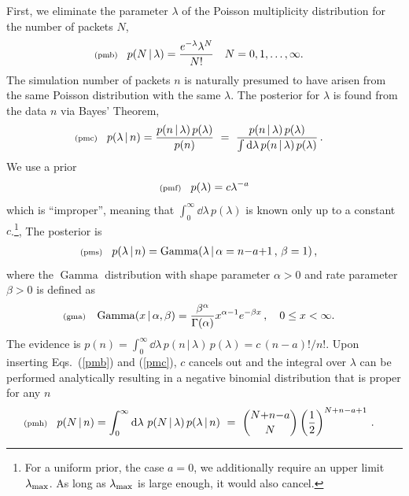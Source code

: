\documentclass[11pt]{article}
\newcommand{\lleq}[1]{\label{#1} }
\renewcommand{\lleq}[1]{\label{#1} {\scriptstyle {\rm (#1)}} \hspace*{2ex} }
\newcommand{\cond}{\,|\,}
\DeclareMathOperator{\GammaDist}{Gamma}
\newcommand{\rmdx}[1]{\dd{#1}} %
\begin{document}
First, we eliminate the parameter $\lambda$ of the Poisson
multiplicity distribution for the number of packets $N$,
\begin{align}
  \lleq{pmb}
  p(N\cond\lambda) &= \frac{e^{-\lambda}\lambda^{N}}{N!}
  \quad N = 0,1,\ldots,\infty.
\end{align}
The simulation number of packets $n$ is naturally presumed to have
arisen from the same Poisson distribution with the same $\lambda$.
The posterior for $\lambda$ is found from the data $n$ via Bayes'
Theorem,
\begin{align}
  \lleq{pmc}
  p(\lambda\cond n) %
  &= \frac{p(n\cond\lambda)\,p(\lambda)} {p(n)}
  \ =\ \frac{p(n\cond\lambda)\,p(\lambda)} %
  {\int \rmdx{\lambda} p(n\cond\lambda)\,p(\lambda)} \,.
\end{align}
We use a prior
\begin{align}
  \lleq{pmf}
  p(\lambda) = c \lambda^{-a}
\end{align}
which is ``improper'', meaning that
$\int_0^\infty \rmdx{\lambda}\,p(\lambda)$ is known only up to a
constant $c$.\footnote{For a uniform prior, the case $a{=}0$, we
  additionally require an upper limit $\lambda_{\rm max}$. As long as
  $\lambda_{\rm max}$ is large enough, it would also cancel.}, The
posterior is
\begin{align}
  \lleq{pms}
  p(\lambda\cond n)
  &= \GammaDist(\lambda \cond \alpha = n{-}a{+}1 \,,\, \beta = 1)\,,
\end{align}
where the $\GammaDist$ distribution with shape parameter $\alpha > 0$ and
rate parameter $\beta > 0$ is defined as
\begin{align}
  \lleq{gma}
  \GammaDist(x\cond \alpha, \beta)
  &= \frac{\beta^\alpha}{\Gamma(\alpha)} x^{\alpha-1} e^{-\beta x}\,,
  \quad 0 \leq x < \infty.
\end{align}
The evidence is
$p(n) =  \int_0^\infty \rmdx{\lambda}\, p(n\cond\lambda)\,p(\lambda) = c\,(n-a)!/n!$.
Upon inserting Eqs.~(\ref{pmb}) and (\ref{pmc}), $c$ cancels out and
the integral over $\lambda$ can be performed analytically resulting in
a negative binomial distribution that is proper for any $n$
\begin{align}
  \lleq{pmh}
  p(N\cond n) %
  &= \int_0^\infty \rmdx{\lambda}\, p(N\cond\lambda)\,p(\lambda\cond n)
  \ =\ \binom{N{+}n{-}a}{N} \left(\frac{1}{2}\right)^{N+n-a+1}\, .
\end{align}
\end{document}
